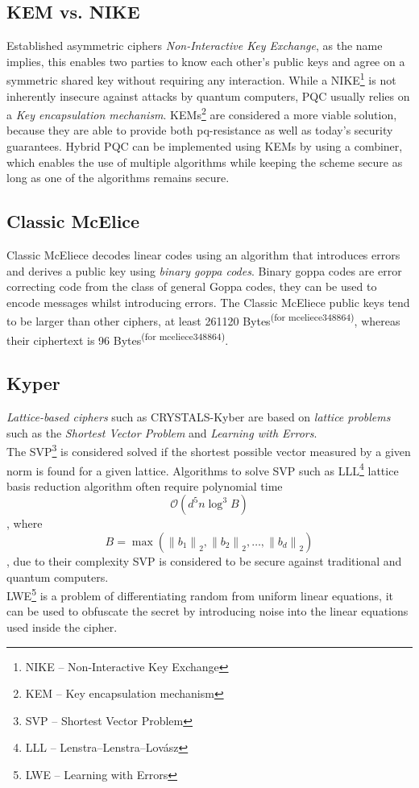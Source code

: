 \documentclass[sigconf]{acmart}
\begin{document}
\subsection{KEM vs. NIKE}
Established asymmetric ciphers \textit{Non-Interactive Key Exchange}, as the name implies, this enables two parties to know each other's public keys and agree on a symmetric shared key without requiring any interaction\cite{cryptoeprint:2012/732}. While a NIKE\footnote{NIKE -- Non-Interactive Key Exchange} is not inherently insecure against attacks by quantum computers, PQC usually relies on a \textit{Key encapsulation mechanism}. KEMs\footnote{KEM -- Key encapsulation mechanism} are considered a more viable solution, because they are able to provide both pq-resistance as well as today's security guarantees. Hybrid PQC can be implemented using KEMs by using a combiner, which enables the use of multiple algorithms while keeping the scheme secure as long as one of the algorithms remains secure\cite{cryptoeprint:2018/903}.

\subsection{Classic McElice}
Classic McEliece decodes linear codes using an algorithm that introduces errors and derives a public key using \textit{binary goppa codes}. Binary goppa codes are error correcting code from the class of general Goppa codes, they can be used to encode messages whilst introducing errors\cite{1055873}. The Classic McEliece public keys tend to be larger than other ciphers, at least 261120 Bytes\textsuperscript{(for mceliece348864)}, whereas their ciphertext is 96 Bytes\textsuperscript{(for mceliece348864)}.

\subsection{Kyper}
\textit{Lattice-based ciphers} such as CRYSTALS-Kyber are based on \textit{lattice problems} such as the \textit{Shortest Vector Problem} and \textit{Learning with Errors}\cite{10.1145/1568318.1568324}. \\
The SVP\footnote{SVP -- Shortest Vector Problem} is considered solved if the shortest possible vector measured by a given norm is found for a given lattice. Algorithms to solve SVP such as LLL\footnote{LLL -- Lenstra–Lenstra–Lovász} lattice basis reduction algorithm often require polynomial time \[\mathcal{O}(d^5 n \log^3 B)\], where \[B = \max(\left\| b_1 \right\|_2, \left\| b_2 \right\|_2, \dots , \left\| b_d \right\|_2)\]\cite{doi:10.1137/070705702}, due to their complexity SVP is considered to be secure against traditional and quantum computers\cite{915326}. \\
LWE\footnote{LWE -- Learning with Errors} is a problem of differentiating random from uniform linear equations\cite{10.1145/2535925}, it can be used to obfuscate the secret by introducing noise into the linear equations used inside the cipher.
\end{document}
